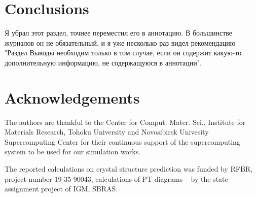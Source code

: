 \documentclass[twoside,twocolumn,9pt]{article}
\begin{document}
\section{Conclusions}
{\color{red}Я убрал этот раздел, точнее переместил его в аннотацию. В большинстве журналов он не обязательный, и я уже несколько раз видел рекомендацию "Раздел Выводы необходим только в том случае, если он содержит какую-то дополнительную информацию, не содержащуюся в аннотации". }

\section*{Acknowledgements}

The authors are thankful to the Center for Comput. Mater. Sci., Institute for Materials Research, Tohoku University and Novosibirsk Univesity Supercomputing Center for their continuous support of the supercomputing system to be used for our simulation works. 

The reported calculations on crystal structure prediction was funded by RFBR, project number 19-35-90043, calculations of PT diagrams – by the state assignment project of IGM, SBRAS.

\balance
\end{document}
